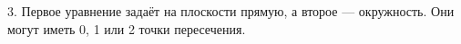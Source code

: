 3. Первое уравнение задаёт на плоскости прямую, а второе --- окружность. Они могут иметь 0, 1 или 2 точки пересечения.\\
